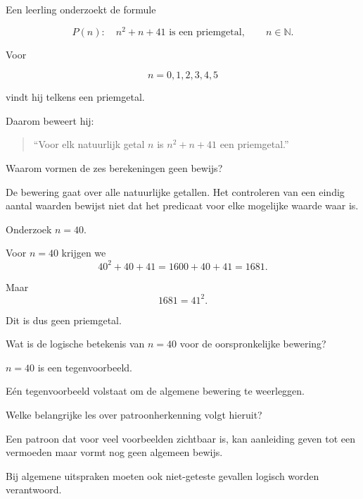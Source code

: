 \documentclass{ximera}
\begin{document}
\begin{oefening}{\oefG}

Een leerling onderzoekt de formule

\[
P(n):\quad n^2+n+41\text{ is een priemgetal},
\qquad n\in\mathbb{N}.
\]

Voor

\[
n=0,1,2,3,4,5
\]

vindt hij telkens een priemgetal.

Daarom beweert hij:

\begin{quote}
``Voor elk natuurlijk getal $n$ is $n^2+n+41$ een priemgetal.''
\end{quote}

\begin{question}
Waarom vormen de zes berekeningen geen bewijs?

\begin{oplossing}
De bewering gaat over alle natuurlijke getallen. Het controleren van
een eindig aantal waarden bewijst niet dat het predicaat voor elke
mogelijke waarde waar is.
\end{oplossing}
\end{question}


\begin{question}
Onderzoek $n=40$.

\begin{oplossing}
Voor $n=40$ krijgen we
\[
40^2+40+41
=
1600+40+41
=
1681.
\]

Maar
\[
1681=41^2.
\]

Dit is dus geen priemgetal.
\end{oplossing}
\end{question}


\begin{question}
Wat is de logische betekenis van $n=40$ voor de oorspronkelijke
bewering?

\begin{oplossing}
$n=40$ is een tegenvoorbeeld.

Eén tegenvoorbeeld volstaat om de algemene bewering te weerleggen.
\end{oplossing}
\end{question}


\begin{question}
Welke belangrijke les over patroonherkenning volgt hieruit?

\begin{oplossing}
Een patroon dat voor veel voorbeelden zichtbaar is, kan aanleiding
geven tot een vermoeden maar vormt nog geen algemeen bewijs.

Bij algemene uitspraken moeten ook niet-geteste gevallen logisch worden
verantwoord.
\end{oplossing}
\end{question}

\end{oefening}
\end{document}
